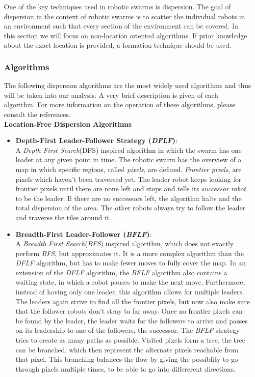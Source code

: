 
One of the key techniques used in robotic swarms is dispersion. The goal of dispersion in the context of robotic swarms is to scatter the individual robots in an environment such that every section of the environment can be covered. In this section we will focus on non-location oriented algorithms. If prior knowledge about the exact location is provided, a formation technique should be used.

\subsubsection{Algorithms}
	The following dispersion algorithms are the most widely used algorithms and thus will be taken into our analysis. A very brief description is given of each algorithm. For more information on the operation of these algorithms, please consult the references.\\
	\textbf{Location-Free Dispersion Algorithms}
	\begin{itemize}
		\item \textbf{Depth-First Leader-Follower Strategy (\emph{DFLF})}\cite{hsiang2004algorithms}:\\
			A \emph{Depth First Search}(DFS) inspired algorithm in which the swarm has one leader at any given point in time. The robotic swarm has the overview of a map in which specific regions, called \emph{pixels}, are defined. \emph{Frontier pixels}, are pixels which haven't been traversed yet. The leader robot keeps looking for frontier pixels until there are none left and stops and tells its \emph{successor robot} to be the leader. If there are no successors left, the algorithm halts and the total dispersion of the area. The other robots always try to follow the leader and traverse the tiles around it.
		\item \textbf{Breadth-First Leader-Follower (\emph{BFLF})}\cite{hsiang2004algorithms}:\\
			A \emph{Breadth First Search}(\emph{BFS}) inspired algorithm, which does not exactly perform \emph{BFS}, but approximates it. It is a more complex algorithm than the \emph{DFLF} algorithm, but has to make fewer moves to fully cover the map. In an extension of the \emph{DFLF} algorithm, the \emph{BFLF} algorithm also contains a waiting state, in which a robot pauses to make the next move. Furthermore, instead of having only one leader, this algorithm allows for multiple leaders. The leaders again strive to find all the frontier pixels, but now also make sure that the follower robots don't stray to far away. Once no frontier pixels can be found by the leader, the leader waits for the followers to arrive and passes on its leadership to one of the followers, the successor. The \emph{BFLF} strategy tries to create as many paths as possible. Visited pixels form a tree, the tree can be branched, which then represent the alternate pixels reachable from that pixel. This branching balances the flow by giving the possiblity to go through pixels multiple times, to be able to go into differerent directions.
	\end{itemize}
